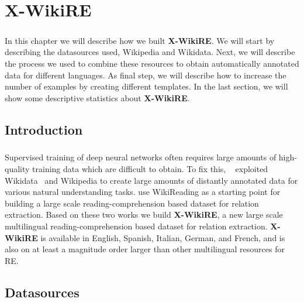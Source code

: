 \chapter{X-WikiRE}
\label{chpt:4}
\paragraph{}
In this chapter we will describe how we built \textbf{X-WikiRE}. We will start by describing the datasources used, Wikipedia and Wikidata. Next, we will describe the process we used to combine these resources to obtain automatically annotated data for different languages. As final step, we will describe how to increase the number of examples by creating different templates. In the last section, we will show some descriptive statistics about \textbf{X-WikiRE}.

\section{Introduction}
\paragraph{}
Supervised training of deep neural networks often requires large amounts of high-quality training data which are difficult to obtain.  To fix this, ~\cite{hewlett2016wikireading} exploited Wikidata~\citep{vwikidata} and Wikipedia to create large amounts of distantly annotated data for various natural understanding tasks. \cite{levy2017zero} use WikiReading as a starting point for building a large scale reading-comprehension based dataset for relation extraction. Based on these two works we build \textbf{X-WikiRE}, a new large scale multilingual reading-comprehension based dataset for relation extraction. \textbf{X-WikiRE} is available in English, Spanish, Italian, German, and French, and is also on at least a magnitude order larger than other multilingual resources for RE.

\section{Datasources}
